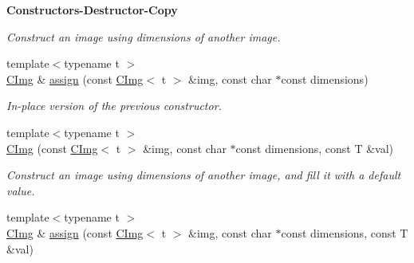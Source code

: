 \begin{Indent}{\bf Constructors-\/\-Destructor-\/\-Copy}
\begin{DoxyCompactItemize}
\begin{DoxyCompactList}\small\item\em Construct an image using dimensions of another image. \end{DoxyCompactList}\item 
\hypertarget{structcimg__library_1_1_c_img_a938c81cc0ebaedb93258277dcc894a2a}{{\footnotesize template$<$typename t $>$ }\\\hyperlink{structcimg__library_1_1_c_img}{C\-Img} \& \hyperlink{structcimg__library_1_1_c_img_a938c81cc0ebaedb93258277dcc894a2a}{assign} (const \hyperlink{structcimg__library_1_1_c_img}{C\-Img}$<$ t $>$ \&img, const char $\ast$const dimensions)}\label{structcimg__library_1_1_c_img_a938c81cc0ebaedb93258277dcc894a2a}

\begin{DoxyCompactList}\small\item\em In-\/place version of the previous constructor. \end{DoxyCompactList}\item 
\hypertarget{structcimg__library_1_1_c_img_a2222ccb12029d22a49d262f7a0335d05}{{\footnotesize template$<$typename t $>$ }\\\hyperlink{structcimg__library_1_1_c_img_a2222ccb12029d22a49d262f7a0335d05}{C\-Img} (const \hyperlink{structcimg__library_1_1_c_img}{C\-Img}$<$ t $>$ \&img, const char $\ast$const dimensions, const T \&val)}\label{structcimg__library_1_1_c_img_a2222ccb12029d22a49d262f7a0335d05}

\begin{DoxyCompactList}\small\item\em Construct an image using dimensions of another image, and fill it with a default value. \end{DoxyCompactList}\item 
\hypertarget{structcimg__library_1_1_c_img_ae2fd412944f9ff7253be509e341d5632}{{\footnotesize template$<$typename t $>$ }\\\hyperlink{structcimg__library_1_1_c_img}{C\-Img} \& \hyperlink{structcimg__library_1_1_c_img_ae2fd412944f9ff7253be509e341d5632}{assign} (const \hyperlink{structcimg__library_1_1_c_img}{C\-Img}$<$ t $>$ \&img, const char $\ast$const dimensions, const T \&val)}\label{structcimg__library_1_1_c_img_ae2fd412944f9ff7253be509e341d5632}


\end{DoxyCompactItemize}
\end{Indent}
